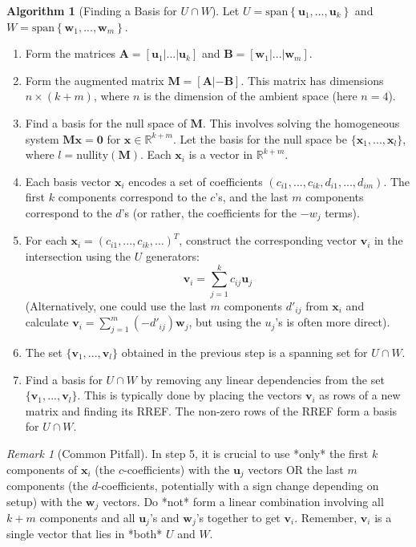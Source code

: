 \documentclass[11pt]{article}
\theoremstyle{definition}
\newtheorem{algorithm}[theorem]{Algorithm}
\theoremstyle{remark}
\newtheorem{remark}[theorem]{Remark}
\newcommand{\R}{\mathbb{R}}
\newcommand{\vsspan}[1]{\text{span}\left\{#1\right\}}
\newcommand{\vecu}{\mathbf{u}}
\newcommand{\vecv}{\mathbf{v}}
\newcommand{\vecw}{\mathbf{w}}
\newcommand{\vecx}{\mathbf{x}}
\newcommand{\veczero}{\mathbf{0}}
\newcommand{\matA}{\mathbf{A}}
\newcommand{\matB}{\mathbf{B}}
\begin{document}
\begin{algorithm}[Finding a Basis for $U \cap W$]
Let $U = \vsspan{\vecu_1, ..., \vecu_k}$ and $W = \vsspan{\vecw_1, ..., \vecw_m}$.
\begin{enumerate}
    \item Form the matrices $\matA = [\vecu_1 | ... | \vecu_k]$ and $\matB = [\vecw_1 | ... | \vecw_m]$.
    \item Form the augmented matrix $\mathbf{M} = [\matA | -\matB]$. This matrix has dimensions $n \times (k+m)$, where $n$ is the dimension of the ambient space (here $n=4$).
    \item Find a basis for the null space of $\mathbf{M}$. This involves solving the homogeneous system $\mathbf{M} \vecx = \veczero$ for $\vecx \in \R^{k+m}$. Let the basis for the null space be $\{\vecx_1, ..., \vecx_l\}$, where $l = \text{nullity}(\mathbf{M})$. Each $\vecx_i$ is a vector in $\R^{k+m}$.
    \item Each basis vector $\vecx_i$ encodes a set of coefficients $(c_{i1}, ..., c_{ik}, d_{i1}, ..., d_{im})$. The first $k$ components correspond to the $c$'s, and the last $m$ components correspond to the $d$'s (or rather, the coefficients for the $-w_j$ terms).
    \item For each $\vecx_i = (c_{i1}, ..., c_{ik}, \dots)^T$, construct the corresponding vector $\vecv_i$ in the intersection using the $U$ generators:
        \[ \vecv_i = \sum_{j=1}^k c_{ij} \vecu_j \]
        (Alternatively, one could use the last $m$ components $d'_{ij}$ from $\vecx_i$ and calculate $\vecv_i = \sum_{j=1}^m (-d'_{ij}) \vecw_j$, but using the $u_j$'s is often more direct).
    \item The set $\{\vecv_1, ..., \vecv_l\}$ obtained in the previous step is a spanning set for $U \cap W$.
    \item Find a basis for $U \cap W$ by removing any linear dependencies from the set $\{\vecv_1, ..., \vecv_l\}$. This is typically done by placing the vectors $\vecv_i$ as rows of a new matrix and finding its RREF. The non-zero rows of the RREF form a basis for $U \cap W$.
\end{enumerate}
\end{algorithm}

\begin{remark}[Common Pitfall]
In step 5, it is crucial to use *only* the first $k$ components of $\vecx_i$ (the $c$-coefficients) with the $\vecu_j$ vectors OR the last $m$ components (the $d$-coefficients, potentially with a sign change depending on setup) with the $\vecw_j$ vectors. Do *not* form a linear combination involving all $k+m$ components and all $\vecu_j$'s and $\vecw_j$'s together to get $\vecv_i$. Remember, $\vecv_i$ is a single vector that lies in *both* $U$ and $W$.
\end{remark}
\end{document}
